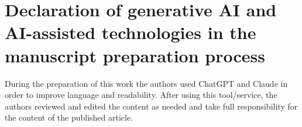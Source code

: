 \documentclass[preprint, 11pt, authoryear]{elsarticle}
\begin{document}
\section*{Declaration of generative AI and AI-assisted technologies in the manuscript preparation process}

During the preparation of this work the authors used ChatGPT and Claude in order to improve language and readability. After using this tool/service, the authors reviewed and edited the content as needed and take full responsibility for the content of the published article.




\end{document}
